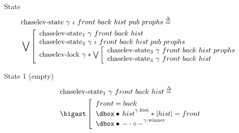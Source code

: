 \begin{frame}{State}
\small
\begin{align*}
		&\mathrm{chaselev \mathhyphen state}\ \gamma\ \iota\ front\ back\ hist\ pub\ prophs
		\eqdef
	\\
		&\bigvee\left[\begin{array}{l}
				\mathrm{chaselev \mathhyphen state_1}\ \gamma\ front\ back\ hist
			\\
				\mathrm{chaselev \mathhyphen state_2}\ \gamma\ \iota\ front\ back\ hist\ pub\ prophs
			\\
				\mathrm{chaselev \mathhyphen lock}\ \gamma \iSep
				\bigvee\left[\begin{array}{l}
						\mathrm{chaselev \mathhyphen state_3}\ \gamma\ front\ back\ hist\ prophs
					\\
						\mathrm{chaselev \mathhyphen state_4}\ \gamma\ front\ back\ hist
				\end{array}\right.
		\end{array}\right.
\end{align*}
\end{frame}


\begin{frame}{State 1 (empty)}
\begin{align*}
		&\mathrm{chaselev \mathhyphen state_1}\ \gamma\ front\ back\ hist
		\eqdef
	\\
		&\iBigsep\left[\begin{array}{l}
				front = back
			\\
				\iGhost{\gamma\mathrm{.hist}}{\iAuth{hist}} \iSep
				| hist | = front
			\\
				\iGhost{\gamma\mathrm{.winner}}{\iAuth{-} \cdot \iFrag{-}}
		\end{array}\right.
\end{align*}
\end{frame}


